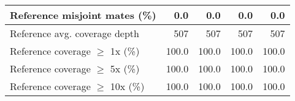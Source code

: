 \documentclass[12pt,a4paper]{article}
\begin{document}
\begin{table}[ht]
\begin{center}
\begin{tabular}{|l*{4}{|r}|}
Reference misjoint mates (\%) & 0.0 & 0.0 & 0.0 & 0.0 \\ \hline
Reference avg. coverage depth & 507 & 507 & 507 & 507 \\ \hline
Reference coverage $\geq$ 1x (\%) & 100.0 & 100.0 & 100.0 & 100.0 \\ \hline
Reference coverage $\geq$ 5x (\%) & 100.0 & 100.0 & 100.0 & 100.0 \\ \hline
Reference coverage $\geq$ 10x (\%) & 100.0 & 100.0 & 100.0 & 100.0 \\ \hline
\end{tabular}
\end{center}
\end{table}
\end{document}
